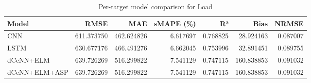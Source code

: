 \begin{table}
\caption{Per-target model comparison for Load}
\begin{tabular}{lrrrrrr}
\toprule
Model & RMSE & MAE & sMAPE (\%) & R² & Bias & NRMSE \\
\midrule
CNN & 611.373750 & 462.624826 & 6.617697 & 0.768825 & 28.924163 & 0.087007 \\
LSTM & 630.677176 & 466.491276 & 6.662045 & 0.753996 & 32.891451 & 0.089755 \\
dCeNN+ELM & 639.726269 & 516.299822 & 7.541129 & 0.747115 & 160.838853 & 0.091032 \\
dCeNN+ELM+ASP & 639.726269 & 516.299822 & 7.541129 & 0.747115 & 160.838853 & 0.091032 \\
\bottomrule
\end{tabular}
\end{table}
